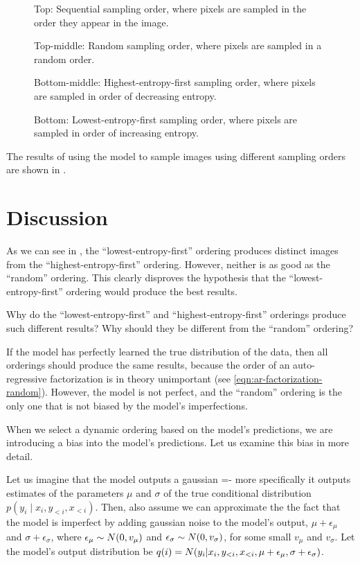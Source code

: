 \begin{figure}
{    Top: Sequential sampling order, where pixels are sampled in the order they appear in the image.

    Top-middle: Random sampling order, where pixels are sampled in a random order.

    Bottom-middle: Highest-entropy-first sampling order, where pixels are sampled in order of decreasing entropy.

    Bottom: Lowest-entropy-first sampling order, where pixels are sampled in order of increasing entropy.}
    \label{fig:order-comparison}
\end{figure}

The results of using the model to sample images using different sampling orders are shown in .

\section{Discussion}
\label{s:a-o-discussion}

As we can see in , the ``lowest-entropy-first'' ordering produces distinct images from the ``highest-entropy-first'' ordering. However, neither is as good as the ``random'' ordering. This clearly disproves the hypothesis that the ``lowest-entropy-first'' ordering would produce the best results.

Why do the ``lowest-entropy-first'' and ``highest-entropy-first'' orderings produce such different results? Why should they be different from the ``random'' ordering?

If the model has perfectly learned the true distribution of the data, then all orderings should produce the same results, because the order of an auto-regressive factorization is in theory unimportant (see \cref{eqn:ar-factorization-random}). However, the model is not perfect, and the ``random'' ordering is the only one that is not biased by the model's imperfections.

When we select a dynamic ordering based on the model's predictions, we are introducing a bias into the model's predictions. Let us examine this bias in more detail.

Let us imagine that the model outputs a gaussian =- more specifically it outputs estimates of the parameters $\mu$ and $\sigma$ of the true conditional distribution $p(y_i \mid x_i, y_{<i}, x_{<i})$. Then, also assume we can approximate the the fact that the model is imperfect by adding gaussian noise to the model's output, $\mu + \epsilon_\mu$ and $\sigma + \epsilon_\sigma$, where $\epsilon_\mu \sim \relax{N}(0, v_\mu)$ and $\epsilon_\sigma \sim \relax{N}(0, v_\sigma)$, for some small $v_\mu$ and $v_\sigma$. Let the model's output distribution be $q(i) = \relax{N}(y_i | x_i, y_{<i}, x_{<i}, \mu + \epsilon_\mu, \sigma + \epsilon_\sigma)$.

